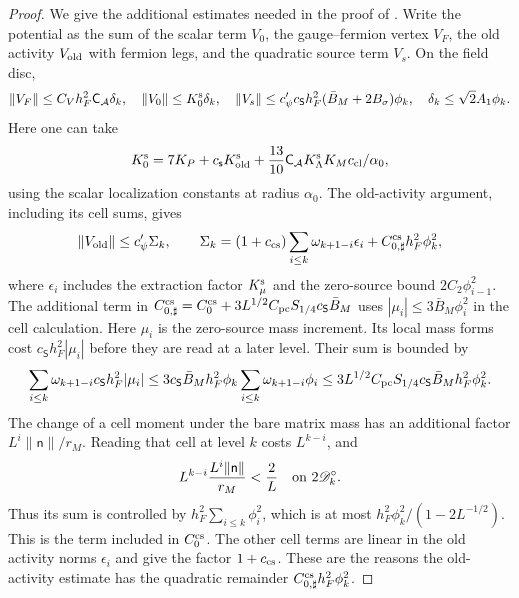 \documentclass[11pt,letterpaper,reqno]{amsart}
\theoremstyle{definition}
\theoremstyle{remark}
\begin{document}
\begin{proof}
We give the additional estimates needed in the proof of
\cite[Prop. 10.1]{QCDM1}.  Write the potential as the sum
of the scalar term $V_0$, the gauge--fermion vertex $V_F$,
the old activity $V_{\rm old}$ with fermion legs, and the
quadratic source term $V_s$.  On the field disc,
\[
 \|V_F\|\le C_Vh_F^2\mathsf C_{\mathcal A}\delta_k,
 \quad \|V_0\|\le K_0^{\rm s}\delta_k,
 \quad \|V_s\|\le c'_\psi c_{\mathsf S}h_F^2
                  (\bar B_M+2B_\sigma)\phi_k,
 \quad \delta_k\le\sqrt2A_1\phi_k.
\]
Here one can take
\[
 K_0^{\rm s}=7K_P+c_{\mathsf s}K_{\rm old}^{\rm s}
       +\frac{13}{10}\mathsf C_{\mathcal A}K_\Lambda^{\rm s}
                         K_Mc_{\rm cl}/\alpha_0,
\]
using the scalar localization constants at radius $\alpha_0$.
The old-activity argument, including its
cell sums, gives
\[
 \|V_{\rm old}\|\le c'_\psi\Sigma_k,\qquad
 \Sigma_k=(1+c_{\rm cs})\sum_{i\le k}
             \omega_{k+1-i}\epsilon_i
             +C_{0,\sharp}^{\rm cs}h_F^2\phi_k^2,
\]
where $\epsilon_i$ includes the extraction factor
$K_\mu^{\rm s}$ and the zero-source bound $2C_2\phi_{i-1}^2$.
The additional term in
$C_{0,\sharp}^{\rm cs}=C_0^{\rm cs}
 +3L^{1/2}C_{\rm pc}S_{1/4}c_{\mathsf S}\bar B_M$
uses $|\mu_i|\le3\bar B_M\phi_i^2$ in the cell calculation.
Here $\mu_i$ is the zero-source mass increment.  Its local
mass forms cost $c_{\mathsf S}h_F^2|\mu_i|$ before they are
read at a later level.  Their sum is bounded by
\[
 \sum_{i\le k}\omega_{k+1-i}c_{\mathsf S}h_F^2|\mu_i|
 \le3c_{\mathsf S}\bar B_Mh_F^2\phi_k
                     \sum_{i\le k}\omega_{k+1-i}\phi_i
 \le3L^{1/2}C_{\rm pc}S_{1/4}
                 c_{\mathsf S}\bar B_Mh_F^2\phi_k^2.
\]
The change of a cell moment under the bare matrix mass has
an additional factor $L^i\|\mathsf n\|/r_M$.
Reading that cell at level $k$ costs $L^{k-i}$, and
\[
 L^{k-i}\frac{L^i\|\mathsf n\|}{r_M}<\frac2L
 \quad\hbox{on }2\mathscr D_k^\circ.
\]
Thus its sum is controlled by $h_F^2\sum_{i\le k}\phi_i^2$,
which is at most $h_F^2\phi_k^2/(1-2L^{-1/2})$.
This is the term included in $C_0^{\rm cs}$.
The other cell terms are linear in the old activity norms
$\epsilon_i$ and give the factor $1+c_{\rm cs}$.
These are the reasons the old-activity estimate has the
quadratic remainder $C_{0,\sharp}^{\rm cs}h_F^2\phi_k^2$.


\end{proof}
\end{document}
